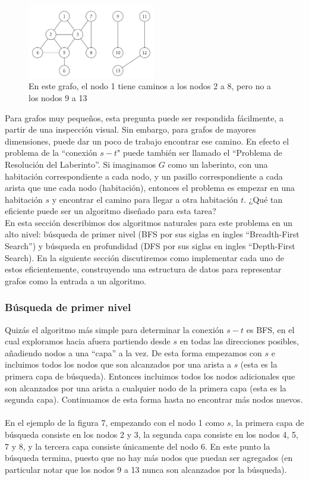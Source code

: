 \documentclass[a4paper, 12pt]{book}
\theoremstyle{dotless}
\begin{document}
\begin{figure}[h]
\centering
\includegraphics[width=0.5\textwidth]{Imagenes-Seccion3/fig32.png}
\caption{En este grafo, el nodo 1 tiene caminos a los nodos 2 a 8, pero no a los nodos 9 a 13}
\label{fig32}
\end{figure}

    Para grafos muy pequeños, esta pregunta puede ser respondida fácilmente, a partir de una inspección visual. Sin embargo, para grafos de mayores dimensiones, puede dar un poco de trabajo encontrar ese camino. En efecto el problema de la ``conexión $s-t$" puede también ser llamado el ``Problema de Resolución del Laberinto''. Si imaginamos $G$ como un laberinto, con una habitación correspondiente a cada nodo, y un pasillo correspondiente a cada arista que une cada nodo (habitación), entonces el problema es empezar en una habitación $s$ y encontrar el camino para llegar a otra habitación $t$. ¿Qué tan eficiente puede ser un algoritmo diseñado para esta tarea? \\

    En esta sección describimos dos algoritmos naturales para este problema en un alto nivel: búsqueda de primer nivel (BFS por sus siglas en ingles ``Breadth-First Search'') y búsqueda en profundidad (DFS por sus siglas en ingles ``Depth-First Search). En la siguiente sección discutiremos como implementar cada uno de estos eficientemente, construyendo una estructura de datos para representar grafos como la entrada a un algoritmo.
    
\subsubsection*{Búsqueda de primer nivel}  
Quizás el algoritmo más simple para determinar la conexión $s-t$ es BFS, en el cual exploramos hacia afuera partiendo desde $s$ en todas las direcciones posibles, añadiendo nodos a una ``capa'' a la vez. De esta forma empezamos con $s$ e incluimos todos los nodos que son alcanzados por una arista a $s$ (esta es la primera capa de búsqueda). Entonces incluimos todos los nodos adicionales que son alcanzados por una arista a cualquier nodo de la primera capa (esta es la segunda capa). Continuamos de esta forma hasta no encontrar más nodos nuevos. \\\\
En el ejemplo de la figura 7, empezando con el nodo 1 como $s$, la primera capa de búsqueda consiste en los nodos 2 y 3, la segunda capa consiste en los nodos 4, 5, 7 y 8, y la tercera capa consiste únicamente del nodo 6. En este punto la búsqueda termina, puesto que no hay más nodos que puedan ser agregados (en particular notar que los nodos 9 a 13 nunca son alcanzados por la búsqueda).
\\
\end{document}
